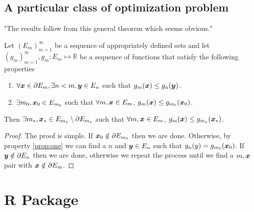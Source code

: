 

\subsection{A particular class of optimization problem}
		"The results follow from this general theorem which seems obvious."

		\begin{theorem}
			\label{thm:solution in interior}
			Let $(E_m)_{m=1}^\infty$ be a sequence of appropriately defined sets and let
			$(g_m)_{m=1}^\infty, g_m: E_m \mapsto \mathbb{R}$ be a sequence of
			functions that satisfy the following properties
			\begin{enumerate}
				\item $\forall {\bm{{x}}} \in \partial E_m, \exists n < m, {\bm{{y}}} \in E_n$ such that
				$g_m({\bm{{x}}}) \leq g_n({\bm{{y}}})$.
				\label{prop:one}
				\item $\exists m_0, {\bm{{x}}}_0 \in E_{m_0}$ such that $\forall m, {\bm{{x}}} \in 
				E_m$, $g_m({\bm{{x}}}) \leq g_{m_0}({\bm{{x}}}_0)$.
			\end{enumerate}
			Then $\exists m_*, {\bm{{x}}}_* \in E_{m_*} \setminus \partial E_{m_*}$ such
			that $\forall m, {\bm{{x}}} \in E_m$, $g_m({\bm{{x}}}) \leq g_{m_*}({\bm{{x}}}_*)$.
		\end{theorem}
		\begin{proof}
			The proof is simple. If ${\bm{{x}}}_0 \notin \partial E_{m_0}$ then we are done.
			Otherwise, by property \ref{prop:one} we can find a $n$ and ${\bm{{y}}} \in 
			E_n$ such that $g_n(y) = g_{m_0}({\bm{{x}}}_0)$. If ${\bm{{y}}} \notin \partial 
			E_n$ then we are done, otherwise we repeat the process until we find a $m, 
			{\bm{{x}}}$ pair with ${\bm{{x}}} \notin \partial E_m$. %
		\end{proof}

\section{R Package}